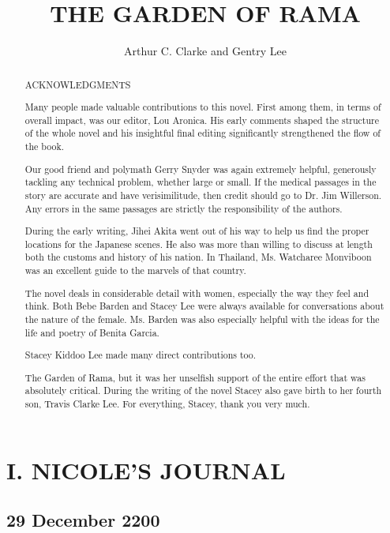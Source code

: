 \documentclass[]{article}
\title{THE GARDEN OF RAMA}
\author{Arthur C.  Clarke and Gentry Lee}
\begin{document}
\maketitle

\begin{abstract}
ACKNOWLEDGMENTS

Many people made valuable contributions to this novel.  First among them, in terms of overall impact, was our editor, Lou Aronica.  His early comments shaped the structure of the whole novel and his insightful final editing significantly strengthened the flow of the book.

Our good friend and polymath Gerry Snyder was again extremely helpful, generously tackling any technical problem, whether large or small.  If the medical passages in the story are accurate and have verisimilitude, then credit should go to Dr.  Jim Willerson.  Any errors in the same passages are strictly the responsibility of the authors.

During the early writing, Jihei Akita went out of his way to help us find the proper locations for the Japanese scenes.  He also was more than willing to discuss at length both the customs and history of his nation.  In Thailand, Ms.  Watcharee Monviboon was an excellent guide to the marvels of that country.

The novel deals in considerable detail with women, especially the way they feel and think.  Both Bebe Barden and Stacey Lee were always available for conversations about the nature of the female.  Ms.  Barden was also especially helpful with the ideas for the life and poetry of Benita Garcia.

Stacey Kiddoo Lee made many direct contributions too.

The Garden of Rama, but it was her unselfish support of the entire effort that was absolutely critical.  During the writing of the novel Stacey also gave birth to her fourth son, Travis Clarke Lee.  For everything, Stacey, thank you very much.


\end{abstract}


\section*{I.  NICOLE’S JOURNAL}
\subsection*{29 December 2200}
\end{document}
